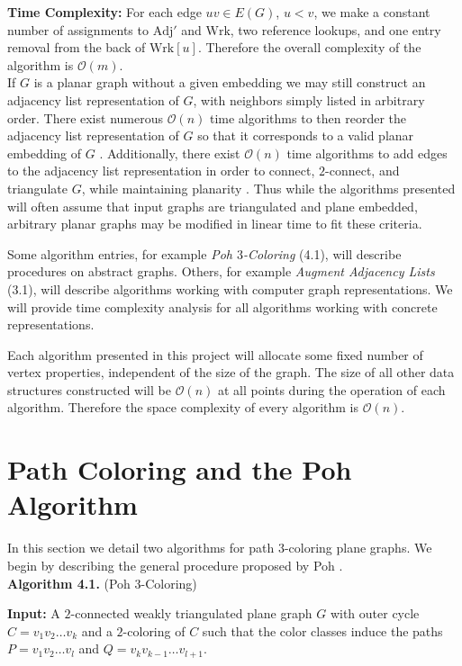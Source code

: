 \documentclass[letterpaper, 12pt]{article}
\theoremstyle{definition}
\theoremstyle{definition}
\theoremstyle{thm}
\theoremstyle{definition}
\begin{document}
\noindent\textbf{Time Complexity:} For each edge $uv\in E(G)$, $u<v$, we make a
constant number of assignments to $\text{Adj}'$ and $\text{Wrk}$, two reference
lookups, and one entry removal from the back of $\text{Wrk}[u]$.
Therefore the overall complexity of the algorithm is $\mathcal{O}(m)$.\\

If $G$ is a planar graph without a given embedding we may still construct an
adjacency list representation of $G$, with neighbors simply listed in arbitrary
order. There exist numerous $\mathcal{O}(n)$ time algorithms to then reorder the
adjacency list representation of $G$ so that it corresponds to a valid planar
embedding of $G$ \cite{tarjan, lempel, boyer,
booth}. Additionally, there exist $\mathcal{O}(n)$ time algorithms to add edges
to the adjacency list representation in order to connect, $2$-connect, and
triangulate $G$, while maintaining planarity \cite{hagerup,reed,eswaran}.
Thus while the algorithms presented will often assume that input graphs are
triangulated and plane embedded, arbitrary planar graphs may be modified in
linear time to fit these criteria.

Some algorithm entries, for example \textit{Poh $3$-Coloring} (4.1), will
describe procedures on abstract graphs. Others, for example
\textit{Augment Adjacency Lists} (3.1), will describe algorithms
working with computer graph representations. We will provide time complexity
analysis for all algorithms working with concrete representations.

Each algorithm presented in this project will allocate some fixed number
of vertex properties, independent of the size of the graph. The size of all
other data structures constructed will be $\mathcal{O}(n)$ at all points during
the operation of each algorithm. Therefore the space complexity of every
algorithm is $\mathcal{O}(n)$.


\section{Path Coloring and the Poh Algorithm}

In this section we detail two algorithms for path $3$-coloring plane graphs. We
begin by describing the general procedure proposed by Poh \cite{poh}.\\

\noindent\textbf{Algorithm 4.1.} (Poh $3$-Coloring)

\noindent\textbf{Input:} A $2$-connected weakly triangulated plane graph $G$
with outer cycle $C=v_1v_2\ldots v_k$ and a $2$-coloring of $C$ such that the
color classes induce the paths $P=v_1v_2\ldots v_l$ and
$Q=v_{k}v_{k-1}\ldots v_{l+1}$.
\end{document}

